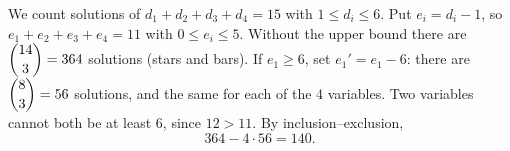 We count solutions of $d_1+d_2+d_3+d_4=15$ with $1\le d_i\le6$. Put $e_i=d_i-1$, so $e_1+e_2+e_3+e_4=11$ with $0\le e_i\le5$. Without the upper bound there are $\dbinom{14}3=364$ solutions (stars and bars). If $e_1\ge6$, set $e_1'=e_1-6$: there are $\dbinom{8}3=56$ solutions, and the same for each of the $4$ variables. Two variables cannot both be at least $6$, since $12>11$. By inclusion--exclusion,
\[364-4\cdot56=\boxed{140}.\]
